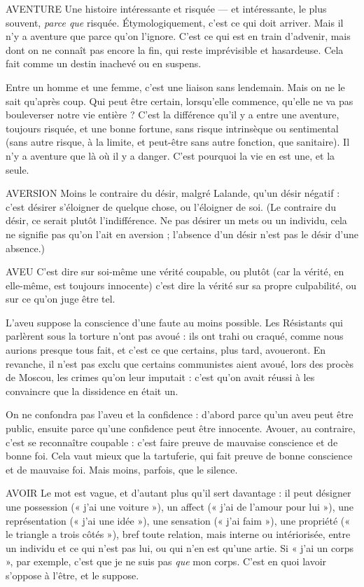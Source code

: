AVENTURE Une histoire intéressante et risquée — et intéressante, le plus
souvent, {\it parce que} risquée. Étymologiquement, c’est ce qui doit
arriver. Mais il n’y a aventure que parce qu’on l’ignore. C’est ce qui est en train
d’advenir, mais dont on ne connaît pas encore la fin, qui reste imprévisible et
hasardeuse. Cela fait comme un destin inachevé ou en suspens.

Entre un homme et une femme, c’est une liaison sans lendemain. Mais on
ne le sait qu'après coup. Qui peut être certain, lorsqu’elle commence, qu’elle ne
va pas bouleverser notre vie entière ? C’est la différence qu’il y a entre une aventure,
toujours risquée, et une bonne fortune, sans risque intrinsèque ou sentimental
(sans autre risque, à la limite, et peut-être sans autre fonction, que sanitaire).
Il n’y a aventure que là où il y a danger. C’est pourquoi la vie en est une,
et la seule.

AVERSION Moins le contraire du désir, malgré Lalande, qu’un désir négatif :
c’est désirer s'éloigner de quelque chose, ou l’éloigner de
soi. (Le contraire du désir, ce serait plutôt l'indifférence. Ne pas désirer un mets
ou un individu, cela ne signifie pas qu’on l’ait en aversion ; l'absence d’un désir
n’est pas le désir d’une absence.)

AVEU C'est dire sur soi-même une vérité coupable, ou plutôt (car la vérité,
en elle-même, est toujours innocente) c’est dire la vérité sur sa propre
culpabilité, ou sur ce qu’on juge être tel.

L’aveu suppose la conscience d’une faute au moins possible. Les Résistants
qui parlèrent sous la torture n’ont pas avoué : ils ont trahi ou craqué, comme
nous aurions presque tous fait, et c’est ce que certains, plus tard, avoueront. En
revanche, il n’est pas exclu que certains communistes aient avoué, lors des
procès de Moscou, les crimes qu’on leur imputait : c’est qu’on avait réussi à les
convaincre que la dissidence en était un.

On ne confondra pas l’aveu et la confidence : d’abord parce qu’un aveu
peut être public, ensuite parce qu’une confidence peut être innocente. Avouer,
au contraire, c’est se reconnaître coupable : c’est faire preuve de mauvaise conscience
et de bonne foi. Cela vaut mieux que la tartuferie, qui fait preuve de
bonne conscience et de mauvaise foi. Mais moins, parfois, que le silence.

AVOIR Le mot est vague, et d’autant plus qu’il sert davantage : il peut désigner
une possession (« j’ai une voiture »), un affect (« j’ai de l'amour
pour lui »), une représentation (« j'ai une idée »), une sensation (« j'ai faim »),
une propriété (« le triangle a trois côtés »), bref toute relation, mais interne ou
intériorisée, entre un individu et ce qui n’est pas lui, ou qui n’en est qu’une
artie. Si « j'ai un corps », par exemple, c’est que je ne suis pas {\it que} mon corps.
C’est en quoi lavoir s’oppose à l’être, et le suppose.

